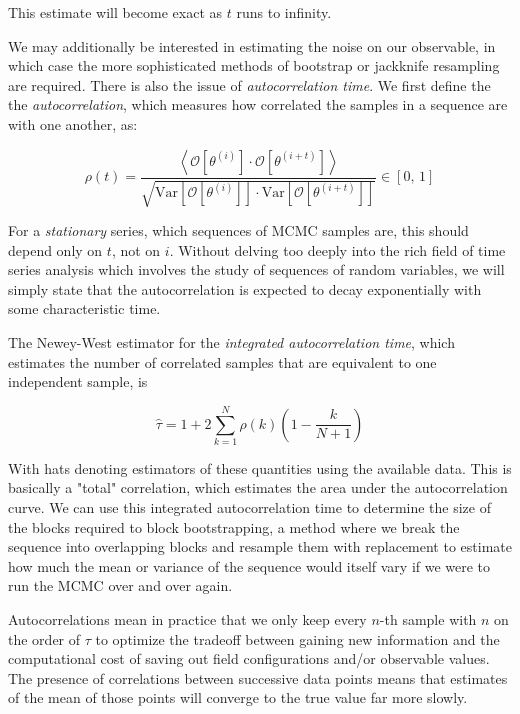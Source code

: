 \documentclass[12pt]{article}
\begin{document}
This estimate will become exact as $t$ runs to infinity.

We may additionally be interested in estimating the noise on our observable, in which case the more sophisticated methods of bootstrap or jackknife resampling
are required. There is also the issue of \textit{autocorrelation time}. We first define the the \textit{autocorrelation}, which measures how correlated 
the samples in a sequence are with one another, as:

\begin{equation}
	\rho(t) = \frac{\left\langle \mathcal{O}[\theta^{(i)}]\cdot\mathcal{O}[\theta^{(i+t)}] \right\rangle}{\sqrt{\mathrm{Var}[\mathcal{O}[\theta^{(i)}]]\cdot\mathrm{Var}[\mathcal{O}[\theta^{(i+t)}]]}}
	\in [0,\,1]
\end{equation}

For a \textit{stationary} series, which sequences of MCMC samples are, this should depend only on $t$, not on $i$. Without delving too deeply into the rich field of time series analysis which involves the study of sequences of random variables, 
we will simply state that the autocorrelation is expected to decay exponentially with some characteristic time.

The Newey-West estimator for the \textit{integrated autocorrelation time}, which estimates the number of correlated samples that are equivalent to one independent sample, is 

\begin{equation}
	\hat{\tau} = 1 + 2\sum_{k=1}^{N}\hat{\rho}(k)\left(1 - \frac{k}{N+1} \right)
\end{equation}

With hats denoting estimators of these quantities using the available data. This is basically a "total" correlation, which estimates the area under the autocorrelation curve. We can use this integrated autocorrelation time to 
determine the size of the blocks required to block bootstrapping, a method where we break the sequence into overlapping blocks and 
resample them with replacement to estimate how much the mean or variance of the sequence would itself vary if we were to run the MCMC over and over again.

Autocorrelations mean in practice that we only keep every $n$-th sample with $n$ on the order of $\tau$ to optimize the tradeoff between gaining new information and the computational cost
of saving out field configurations and/or observable values. The presence of correlations between successive data points means that estimates of the mean of those points
will converge to the true value far more slowly.
\end{document}
